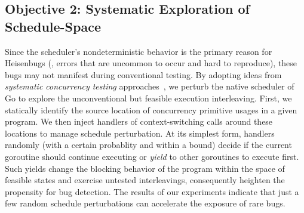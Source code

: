 \subsection{Objective 2: Systematic Exploration of Schedule-Space}
Since the scheduler's nondeterministic behavior is the primary reason for Heisenbugs (\ie, errors that are uncommon to occur and hard to reproduce), these bugs may not manifest during conventional testing.
%
By adopting ideas from \textit{systematic concurrency testing} approaches~\cite{dpor,thomson-concurrencyTesting-ppopp14,emmi-delayBounded-popl11,burckhardt-depthBug-asplos10,madanlal-preemptionBound-pldi07,yu-maple-oopsla12,joshi-calfuzzer,contest-jgi01,edelstein2003contest,hong-syncTesting-issta12,christakis-erlang-icst13,yuan-morpheus-asplos20}, we perturb the native scheduler of Go to explore the unconventional but feasible execution interleaving.
%
First, we statically identify the source location of concurrency primitive usages in a given program.
%
We then inject handlers of context-switching calls around these locations to manage schedule perturbation.
%
At its simplest form, handlers randomly (with a certain probablity and within a bound) decide if the current goroutine should continue executing or \textit{yield} to other goroutines to execute first.
%
Such yields change the blocking behavior of the program within the space of feasible states and exercise untested interleavings, consequently heighten the propensity for bug detection.
%
The results of our experiments indicate that just a few random schedule perturbations can accelerate the exposure of rare bugs.

